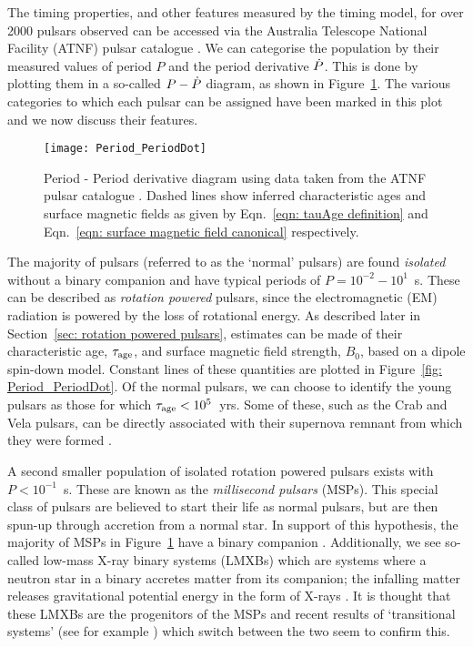 The timing properties, and other features measured by the timing model, for
over 2000 pulsars observed can be accessed via the Australia Telescope National
Facility (ATNF) pulsar catalogue \citep{ATNF}.  We can categorise the
population by their measured values of period $P$ and the period derivative
$\dot{P}$. This is done by plotting them in a so-called $P - \dot{P}$ diagram, as
shown in Figure~\ref{fig: Period_PeriodDot}.  The various categories to which
each pulsar can be assigned have been marked in this plot and we now discuss
their features.

\begin{figure}[htb]
\centering
\texttt{[image: Period\_PeriodDot]} 
\caption{Period -
Period derivative diagram using data taken from the ATNF pulsar catalogue
\citep{ATNF}. Dashed lines show inferred characteristic ages and 
surface magnetic fields as given by Eqn.~\eqref{eqn: tauAge definition}
and Eqn.~\eqref{eqn: surface magnetic field canonical} respectively.}
\label{fig: Period_PeriodDot}
\end{figure}

The majority of pulsars (referred to as the `normal' pulsars) are found
\emph{isolated} without a binary companion and have typical periods of
$P=10^{-2}-10^{1}$~s. These can be described as \emph{rotation powered}
pulsars, since the electromagnetic (EM) radiation is powered by the loss of
rotational energy. As described later in Section~\ref{sec: rotation powered
pulsars}, estimates can be made of their characteristic age, $\tau_{\mathrm{age}}$, and
surface magnetic field strength, $B_{0}$, based on a dipole spin-down model.
Constant lines of these quantities are plotted in Figure~\ref{fig:
Period_PeriodDot}. Of the normal pulsars, we can choose to identify the young
pulsars as those for which $\tau_{\mathrm{age}}<10^{5}$~yrs. Some of these, such as the
Crab and Vela pulsars, can be directly associated with their supernova remnant
from which they were formed \citep{Kaspi1996}.

A second smaller population of isolated rotation powered pulsars exists with
$P<10^{-1}$~s. These are known as the \emph{millisecond pulsars} (MSPs). This
special class of pulsars are believed to start their life as normal pulsars,
but are then spun-up through accretion from a normal star. In support of this
hypothesis, the majority of MSPs in Figure~\ref{fig: Period_PeriodDot} have a
binary companion \citep{wijnands1998millisecond}. Additionally, we see so-called
low-mass X-ray binary systems (LMXBs) which are systems where a neutron star in
a binary accretes matter from its companion; the infalling matter releases
gravitational potential energy in the form of X-rays \citep{lewin1997x}. It is
thought that these LMXBs are the progenitors of the MSPs and recent results of
`transitional systems' (see for example \citep{archibald2009radio}) which
switch between the two seem to confirm this.

